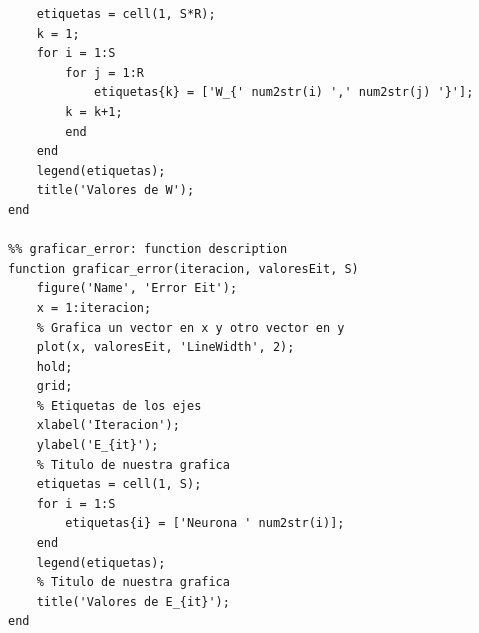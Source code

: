 \documentclass[12pt, titlepage]{article}
\begin{document}
\begin{lstlisting}
    etiquetas = cell(1, S*R);
    k = 1;
    for i = 1:S
        for j = 1:R
            etiquetas{k} = ['W_{' num2str(i) ',' num2str(j) '}'];
        k = k+1;
        end
    end
    legend(etiquetas);
    title('Valores de W');
end

%% graficar_error: function description
function graficar_error(iteracion, valoresEit, S)
    figure('Name', 'Error Eit');
    x = 1:iteracion;
    % Grafica un vector en x y otro vector en y
    plot(x, valoresEit, 'LineWidth', 2);
    hold;
    grid;
    % Etiquetas de los ejes
    xlabel('Iteracion');
    ylabel('E_{it}');
    % Titulo de nuestra grafica
    etiquetas = cell(1, S);
    for i = 1:S
        etiquetas{i} = ['Neurona ' num2str(i)];
    end
    legend(etiquetas);
    % Titulo de nuestra grafica
    title('Valores de E_{it}');
end
    \end{lstlisting}
\end{document}
